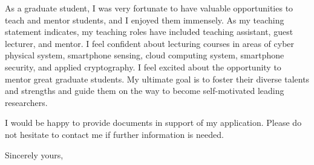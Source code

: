 \documentclass[11pt]{letter} %
\begin{document}
\begin{letter}{}
As a graduate student, I was very fortunate to have valuable opportunities to teach and mentor students, and I enjoyed them immensely. As my teaching statement indicates, my teaching roles have included teaching assistant, guest lecturer, and mentor. I feel confident about lecturing courses in areas of cyber physical system, smartphone sensing, cloud computing system, smartphone security, and applied cryptography. I feel excited about the opportunity to mentor great graduate students. My ultimate goal is to foster their diverse talents and strengths and guide them on the way to become self-motivated leading researchers. %

I would be happy to provide documents in support of my application. Please do not hesitate to contact me if further information is needed. 

\closing{Sincerely yours,}




\end{letter}
\end{document}
